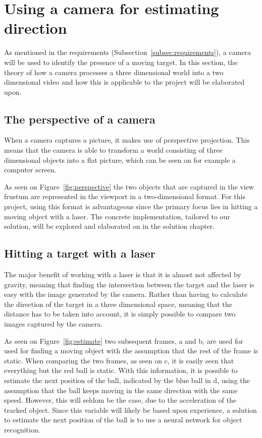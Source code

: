 \section{Using a camera for estimating direction}
As mentioned in the requirements (Subsection~\ref{subsec:requirements}), a camera will be used to identify the presence of a moving target.
In this section, the theory of how a camera processes a three dimensional world into a two dimensional video and how this is applicable to the project will be elaborated upon.

\subsection{The perspective of a camera}
When a camera captures a picture, it makes use of perspective projection.
This means that the camera is able to transform a world consisting of three dimensional objects into a flat picture, which can be seen on for example a computer screen.


As seen on Figure~\ref{fig:perspective} the two objects that are captured in the view frustum are represented in the viewport in a two-dimensional format.
For this project, using this format is advantageous since the primary focus lies in hitting a moving object with a laser.
The concrete implementation, tailored to our solution, will be explored and elaborated on in the solution chapter.


\subsection{Hitting a target with a laser}
The major benefit of working with a laser is that it is almost not affected by gravity, meaning that finding the intersection between the target and the laser is easy with the image generated by the camera.
Rather than having to calculate the direction of the target in a three dimensional space, meaning that the distance has to be taken into account, it is simply possible to compare two images captured by the camera.

As seen on Figure~\ref{fig:estimate} two subsequent frames, a and b, are used for used for finding a moving object with the assumption that the rest of the frame is static. 
When comparing the two frames, as seen on c, it is easily seen that everything but the red ball is static.
With this information, it is possible to estimate the next position of the ball, indicated by the blue ball in d, using the assumption that the ball keeps moving in the same direction with the same speed.
However, this will seldom be the case, due to the acceleration of the tracked object.
Since this variable will likely be based upon experience, a solution to estimate the next position of the ball is to use a neural network for object recognition.

